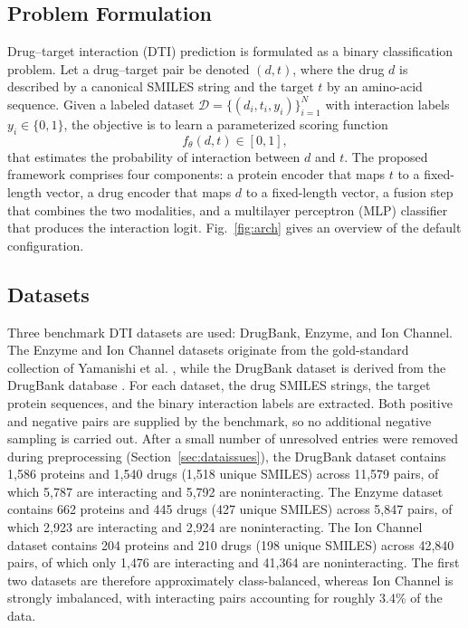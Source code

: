 \documentclass[conference]{IEEEtran}
\begin{document}
\subsection{Problem Formulation}
Drug--target interaction (DTI) prediction is formulated as a binary
classification problem. Let a drug--target pair be denoted $(d, t)$, where the
drug $d$ is described by a canonical SMILES string and the target $t$ by an
amino-acid sequence. Given a labeled dataset
$\mathcal{D} = \{(d_i, t_i, y_i)\}_{i=1}^{N}$ with interaction labels
$y_i \in \{0, 1\}$, the objective is to learn a parameterized scoring function
\begin{equation}
f_{\theta}(d, t) \in [0, 1],
\label{eq:problem}
\end{equation}
that estimates the probability of interaction between $d$ and $t$. The proposed
framework comprises four components: a protein encoder that maps $t$ to a
fixed-length vector, a drug encoder that maps $d$ to a fixed-length vector, a
fusion step that combines the two modalities, and a multilayer perceptron (MLP)
classifier that produces the interaction logit. Fig.~\ref{fig:arch} gives an
overview of the default configuration.

\subsection{Datasets}
Three benchmark DTI datasets are used: DrugBank, Enzyme, and Ion Channel. The
Enzyme and Ion Channel datasets originate from the gold-standard collection of
Yamanishi et al. \cite{ref_yamanishi}, while the DrugBank dataset is derived
from the DrugBank database \cite{ref_drugbank}. For each dataset, the drug SMILES
strings, the target protein sequences, and the binary interaction labels are
extracted. Both positive and negative pairs are supplied by the benchmark, so no
additional negative sampling is carried out. After a small number of unresolved
entries were removed during preprocessing (Section~\ref{sec:dataissues}), the
DrugBank dataset contains 1{,}586 proteins and 1{,}540 drugs (1{,}518 unique
SMILES) across 11{,}579 pairs, of which 5{,}787 are interacting and 5{,}792 are
noninteracting. The Enzyme dataset contains 662 proteins and 445 drugs (427
unique SMILES) across 5{,}847 pairs, of which 2{,}923 are interacting and
2{,}924 are noninteracting. The Ion Channel dataset contains 204 proteins and
210 drugs (198 unique SMILES) across 42{,}840 pairs, of which only 1{,}476 are
interacting and 41{,}364 are noninteracting. The first two datasets are
therefore approximately class-balanced, whereas Ion Channel is strongly
imbalanced, with interacting pairs accounting for roughly 3.4\% of the data.
\end{document}

